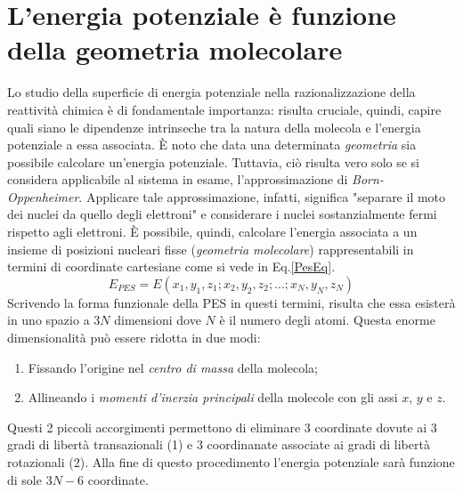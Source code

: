 \documentclass[oneside]{amsbook}
\numberwithin{section}{chapter}
\numberwithin{equation}{section}
\numberwithin{figure}{section}
\begin{document}
\section{L'energia potenziale è funzione della geometria molecolare}
Lo studio della superficie di energia potenziale nella razionalizzazione della reattività chimica è di fondamentale importanza: risulta cruciale, quindi, capire quali siano le dipendenze intrinseche tra la natura della molecola e l'energia potenziale a essa associata.
\`E noto che data una determinata \emph{geometria} sia possibile calcolare un'energia potenziale. Tuttavia, ciò risulta vero solo se si considera applicabile al sistema in esame, l'approssimazione di \emph{Born-Oppenheimer}. Applicare tale approssimazione, infatti, significa "separare il moto dei nuclei da quello degli elettroni" e considerare i nuclei sostanzialmente fermi rispetto agli elettroni. \`E possibile, quindi, calcolare l'energia associata a un insieme di posizioni nucleari fisse (\emph{geometria molecolare}) rappresentabili in termini di coordinate cartesiane come si vede in Eq.\ref{PesEq}.
\begin{equation}
\label{PesEq}
E_{PES}=E(x_1,y_1,z_1;x_2,y_2,z_2;...;x_N,y_N,z_N)
\end{equation}
Scrivendo la forma funzionale della PES in questi termini, risulta che essa esisterà in uno spazio a $3N$ dimensioni dove $N$ è il numero degli atomi. Questa enorme dimensionalità può essere ridotta in due modi:
\begin{enumerate}
\item Fissando l'origine nel \emph{centro di massa} della molecola;
\item Allineando i \emph{momenti d'inerzia principali} della molecole con gli assi $x$, $y$ e $z$.
\end{enumerate}
Questi 2 piccoli accorgimenti permettono di eliminare 3 coordinate dovute ai 3 gradi di libertà transazionali (1) e 3 coordinanate associate ai gradi di libertà rotazionali (2). Alla fine di questo procedimento l'energia potenziale sarà funzione di sole $3N-6$ coordinate.
\end{document}
